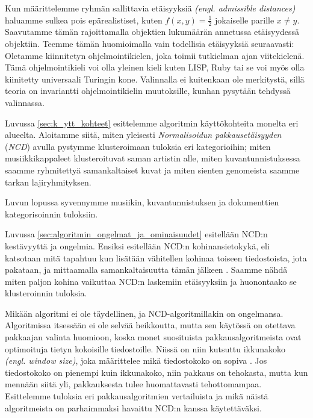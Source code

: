 \documentclass[12pt,finnish,draft]{tktltiki2}
\theoremstyle{definition}
\theoremstyle{remark}
\newcommand{\engl}[1]{\emph{(engl. #1)}}
\begin{document}
  Kun määrittelemme ryhmän sallittavia etäisyyksiä \engl{admissible distances} haluamme sulkea pois epärealistiset, kuten $f(x,y) = \frac{1}{2}$ jokaiselle parille $x \neq y$.
  Saavutamme tämän rajoittamalla objektien lukumäärän annetussa etäisyydessä objektiin.
  Teemme tämän huomioimalla vain todellisia etäisyyksiä seuraavasti: Oletamme kiinnitetyn ohjelmointikielen, joka toimii tutkielman ajan viitekielenä.
  Tämä ohjelmointikieli voi olla yleinen kieli kuten LISP, Ruby tai se voi myös olla kiinitetty universaali Turingin kone. \cite{CV05,cilibrasi2007google}
  Valinnalla ei kuitenkaan ole merkitystä, sillä teoria on invariantti ohjelmointikielin muutoksille, kunhan pysytään tehdyssä valinnassa.


\label{par:intro-3}
  Luvussa \ref{sec:k_ytt_kohteet} esittelemme algoritmin käyttökohteita monelta eri alueelta.
  Aloitamme siitä, miten yleisesti \emph{Normalisoidun pakkausetäisyyden} (\emph{NCD}) avulla pystymme klusteroimaan tuloksia eri kategorioihin; miten musiikkikappaleet klusteroituvat saman artistin alle, miten kuvantunnistuksessa saamme ryhmitettyä samankaltaiset kuvat ja miten sienten genomeista saamme tarkan lajiryhmityksen.


  Luvun lopussa syvennymme musiikin, kuvantunnistuksen ja dokumenttien kategorisoinnin tuloksiin.


\label{par:intro-4}
  Luvussa \ref{sec:algoritmin_ongelmat_ja_ominaisuudet} esitellään NCD:n kestävyyttä ja ongelmia.
  Ensiksi esitellään NCD:n kohinansietokykä, eli katsotaan mitä tapahtuu kun lisätään vähitellen kohinaa toiseen tiedostoista, jota pakataan, ja mittaamalla samankaltaisuutta tämän jälkeen \cite{4167725}.
  Saamme nähdä miten paljon kohina vaikuttaa NCD:n laskemiin etäisyyksiin ja huonontaako se klusteroinnin tuloksia.


  Mikään algoritmi ei ole täydellinen, ja NCD-algoritmillakin on ongelmansa.
  Algoritmissa itsessään ei ole selvää heikkoutta, mutta sen käytössä on otettava pakkaajan valinta huomioon, koska monet suosituista pakkausalgoritmeista ovat optimoituja tietyn kokoisille tiedostoille.
  Niissä on niin kutsuttu ikkunakoko \engl{window size}, joka määrittelee mikä tiedostokoko on sopiva \cite{cebrian2005common}.
  Jos tiedostokoko on pienempi kuin ikkunakoko, niin pakkaus on tehokasta, mutta kun mennään siitä yli, pakkauksesta tulee huomattavasti tehottomampaa.
  Esittelemme tuloksia eri pakkausalgoritmien vertailuista ja mikä näistä algoritmeista on parhaimmaksi havaittu NCD:n kanssa käytettäväksi.
\end{document}
